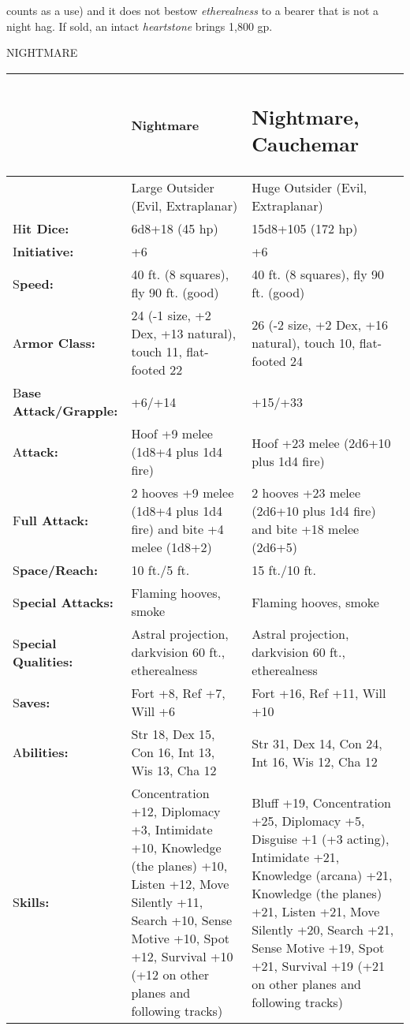 \documentclass{article}
\begin{document}
counts as a use) and it does not bestow \textit{etherealness }to a bearer that 
is not a night hag. If sold, an intact \textit{heartstone }brings 1,800 gp. 

\vspace{12pt}
{\LARGE{}NIGHTMARE}

\begin{tabular}{|>{\raggedright}p{47pt}|>{\raggedright}p{130pt}|>{\raggedright}p{136pt}|}
\hline
 & N\textbf{ightmare} & \subsection*{N\textbf{ightmare, Cauchemar}}\tabularnewline
\hline
 & Large Outsider (Evil, Extraplanar) & Huge Outsider (Evil, Extraplanar)\tabularnewline
\hline
H\textbf{it Dice:} & 6d8+18 (45 hp) & 15d8+105 (172 hp)\tabularnewline
\hline
I\textbf{nitiative:} & +6 & +6\tabularnewline
\hline
S\textbf{peed:} & 40 ft. (8 squares), fly 90 ft. (good) & 40 ft. (8 squares), fly 
90 ft. (good)\tabularnewline
\hline
A\textbf{rmor Class:} & 24 (-1 size, +2 Dex, +13 natural), touch 11, flat-footed 
22 & 26 (-2 size, +2 Dex, +16 natural), touch 10, flat-footed 24\tabularnewline
\hline
B\textbf{ase Attack/Grapple:} & +6/+14 & +15/+33\tabularnewline
\hline
A\textbf{ttack:} & Hoof +9 melee (1d8+4 plus 1d4 fire)  & Hoof +23 melee (2d6+10 
plus 1d4 fire)\tabularnewline
\hline
F\textbf{ull Attack:} & 2 hooves +9 melee (1d8+4 plus 1d4 fire) and bite +4 melee 
(1d8+2) & 2 hooves +23 melee (2d6+10 plus 1d4 fire) and bite +18 melee (2d6+5)\tabularnewline
\hline
S\textbf{pace/Reach:} & 10 ft./5 ft. & 15 ft./10 ft.\tabularnewline
\hline
S\textbf{pecial Attacks:} & Flaming hooves, smoke & Flaming hooves, smoke\tabularnewline
\hline
S\textbf{pecial Qualities:} & Astral projection, darkvision 60 ft., etherealness & Astral 
projection, darkvision 60 ft., etherealness\tabularnewline
\hline
S\textbf{aves:} & Fort +8, Ref +7, Will +6 & Fort +16, Ref +11, Will +10\tabularnewline
\hline
A\textbf{bilities:} & Str 18, Dex 15, Con 16, Int 13, Wis 13, Cha 12 & Str 31, 
Dex 14, Con 24, Int 16, Wis 12, Cha 12\tabularnewline
\hline
S\textbf{kills:} & Concentration +12, Diplomacy +3, Intimidate +10, Knowledge (the 
planes) +10, Listen +12, Move Silently +11, Search +10, Sense Motive +10, Spot 
+12, Survival +10 (+12 on other planes and following tracks) & Bluff +19, Concentration 
+25, Diplomacy +5, Disguise +1 (+3 acting), Intimidate +21, Knowledge (arcana) 
+21, Knowledge (the planes) +21, Listen +21, Move Silently +20, Search +21, Sense 
Motive +19, Spot +21, Survival +19 (+21 on other planes and following tracks)\tabularnewline

\end{tabular}
\end{document}

